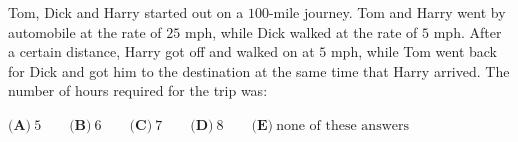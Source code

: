 Tom, Dick and Harry started out on a $100$-mile journey. Tom and Harry went by automobile at the rate of $25$ mph, while Dick walked at the rate of $5$ mph. After a certain distance, Harry got off and walked on at $5$ mph, while Tom went back for Dick and got him to the destination at the same time that Harry arrived. The number of hours required for the trip was:

$\textbf{(A)}\ 5\qquad\textbf{(B)}\ 6\qquad\textbf{(C)}\ 7\qquad\textbf{(D)}\ 8\qquad\textbf{(E)}\ \text{none of these answers}$

